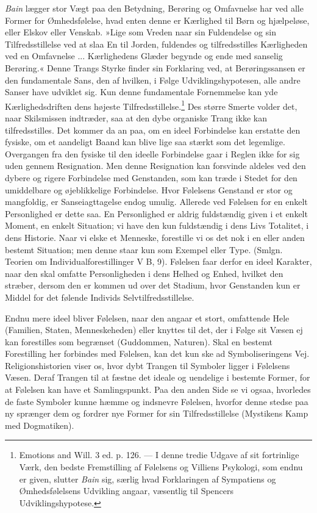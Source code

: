 \documentclass[12pt,a4paper,openany]{book}
\newcommand{\opage}[1]{\marginnote{\footnotesize\textit{[#1]}}}
\begin{document}
\emph{Bain} lægger stor Vægt paa den Betydning, Berøring og Omfavnelse
har ved alle Former for Ømhedsfølelse, hvad enten denne er Kærlighed til
Børn og hjælpeløse, eller Elskov eller Venskab. »Lige som Vreden naar
sin Fuldendelse og sin Tilfredsstillelse ved at slaa En til Jorden,
fuldendes og
\opage{305}tilfredsstilles Kærligheden ved en Omfavnelse ...
Kærlighedens Glæder begynde og ende med sanselig Berøring.« Denne Trangs
Styrke finder sin Forklaring ved, at Berøringssansen er den fundamentale
Sans, den af hvilken, i Følge Udviklingshypotesen, alle andre Sanser
have udviklet sig. Kun denne fundamentale Fornemmelse kan yde
Kærlighedsdriften dens højeste Tilfredsstillelse.\footnote[1]{Emotions
and Will. 3 ed. p. 126. --- I denne tredie Udgave af sit fortrinlige
Værk, den bedste Fremstilling af Følelsens og Villiens Psykologi, som
endnu er given, slutter \emph{Bain} sig, særlig hvad Forklaringen af
Sympatiens og Ømhedsfølelsens Udvikling angaar, væsentlig til Spencers
Udviklingshypotese.} Des større Smerte volder det, naar Skilsmissen
indtræder, saa at den dybe organiske Trang ikke kan tilfredsstilles. Det
kommer da an paa, om en ideel Forbindelse kan erstatte den fysiske, om
et aandeligt Baand kan blive lige saa stærkt som det legemlige.
Overgangen fra den fysiske til den ideelle Forbindelse gaar i Reglen
ikke for sig uden gennem Resignation. Men denne Resignation kan
forsvinde aldeles ved den dybere og rigere Forbindelse med Genstanden,
som kan træde i Stedet for den umiddelbare og øjeblikkelige Forbindelse.
Hvor Følelsens Genstand er stor og mangfoldig, er Sanseiagttagelse endog
umulig. Allerede ved Følelsen for en enkelt Personlighed er dette saa.
En Personlighed er aldrig fuldstændig given i et enkelt Moment, en
enkelt Situation; vi have den kun fuldstændig i dens Livs Totalitet, i
dens Historie. Naar vi elske et Menneske, forestille vi os det nok i en
eller anden bestemt Situation; men denne staar kun som Exempel eller
Type. (Smlgn. Teorien om Individualforestillinger V B, 9). Følelsen faar
derfor en ideel Karakter, naar den skal omfatte Personligheden i dens
Helhed og Enhed, hvilket den stræber, dersom den er kommen ud over det
Stadium, hvor Genstanden kun er Middel for det følende Individs
Selvtilfredsstillelse.

Endnu mere ideel bliver Følelsen, naar den angaar et stort, omfattende
Hele (Familien, Staten, Menneskeheden) eller knyttes til det, der i
Følge sit Væsen ej kan forestilles som begrænset (Guddommen, Naturen).
Skal en bestemt Forestilling her forbindes med Følelsen, kan det kun ske
ad
\opage{306}Symboliseringens Vej. Religionshistorien viser os, hvor dybt
Trangen til Symboler ligger i Følelsens Væsen. Deraf Trangen til at
fæstne det ideale og uendelige i bestemte Former, for at Følelsen kan
have et Samlingspunkt. Paa den anden Side se vi ogsaa, hvorledes de
faste Symboler kunne hæmme og indsnevre Følelsen, hvorfor denne stedse
paa ny sprænger dem og fordrer nye Former for sin Tilfredsstillelse
(Mystikens Kamp med Dogmatiken).
\end{document}
